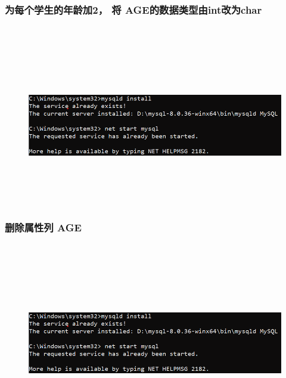 \documentclass{ctexart}
\begin{document}
\subsubsection{为每个学生的年龄加2， 将 AGE的数据类型由int改为char}
\begin{lstlisting}[language=sql]
	
\end{lstlisting}
\begin{figure}[H]
	\centering 
	\includegraphics[height=7cm,width=14cm]{1.png}
	\end{figure}
\subsubsection{删除属性列 AGE}
\begin{lstlisting}[language=sql]
	
\end{lstlisting}
\begin{figure}[H]
	\centering 
	\includegraphics[height=7cm,width=14cm]{1.png}
	\end{figure}
\end{document}
